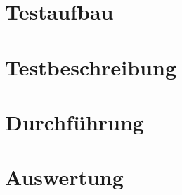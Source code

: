 \documentclass{article}%
\begin{document}
\section{Testaufbau}%
\label{sec:Testaufbau}%

%
\newpage%
\section{Testbeschreibung}%
\label{sec:Testbeschreibung}%

%
\newpage%
\section{Durchführung}%
\label{sec:Durchfhrung}%

%
\newpage%
\section{Auswertung}%
\label{sec:Auswertung}%

%
\newpage%
\end{document}

